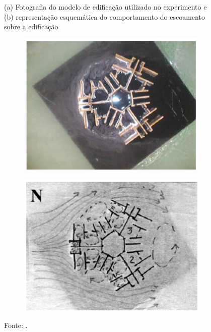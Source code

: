 \documentclass[10pt, a4paper]{article}
\begin{document}
\begin{figure}[h!]
	\centering
	\caption{(a) Fotografia do modelo de edificação utilizado no experimento e (b) representação esquemática do comportamento do escoamento sobre a edificação}
	\label{fig-exemplo}
	\begin{subfigure}[b]{0.45\textwidth}
		\centering
		\includegraphics[width=\textwidth]{fig-exemploA}
		\caption{}
		\label{fig-exemploA}
	\end{subfigure}
	\hfill
	\begin{subfigure}[b]{0.45\textwidth}
		\centering
		\includegraphics[width=\textwidth]{fig-exemploB}
		\caption{}
		\label{fig-exemploB}
	\end{subfigure}
	\caption*{Fonte: \cite{toledo-pereira:clacs2004}.}
\end{figure}
\end{document}
